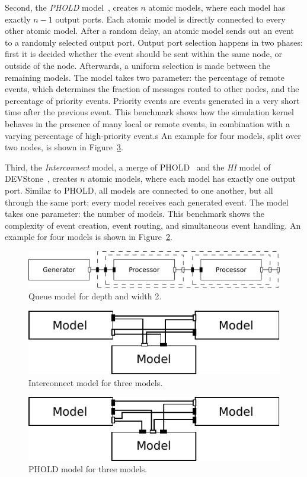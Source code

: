 Second, the \textit{PHOLD} model~\cite{PHOLD}, creates $n$ atomic models, where each model has exactly $n-1$ output ports.
Each atomic model is directly connected to every other atomic model.
After a random delay, an atomic model sends out an event to a randomly selected output port.
Output port selection happens in two phases: first it is decided whether the event should be sent within the same node, or outside of the node.
Afterwards, a uniform selection is made between the remaining models.
The model takes two parameter: the percentage of remote events, which determines the fraction of messages routed to other nodes, and the percentage of priority events. Priority events are events generated in a very short time after the previous event.
This benchmark shows how the simulation kernel behaves in the presence of many local or remote events, in combination with a varying percentage of high-priority event.s
An example for four models, split over two nodes, is shown in Figure~\ref{fig:PHOLD_model}.
	
Third, the \textit{Interconnect} model, a merge of PHOLD~\cite{PHOLD} and the \textit{HI} model of DEVStone~\cite{DEVStone}, creates $n$ atomic models, where each model has exactly one output port.
Similar to PHOLD, all models are connected to one another, but all through the same port: every model receives each generated event.
The model takes one parameter: the number of models.
This benchmark shows the complexity of event creation, event routing, and simultaneous event handling.
An example for four models is shown in Figure~\ref{fig:interconnect_model}.

\begin{figure}
	\center
	\includegraphics[width=\columnwidth]{fig/queue_model_fixed.pdf}
	\caption{Queue model for depth and width 2.}
	\label{fig:queue_model}
\end{figure}
	
\begin{figure}
    \center
	\includegraphics[width=\modelfraction\columnwidth]{fig/interconnect_model.pdf}
	\caption{Interconnect model for three models.}
	\label{fig:interconnect_model}
\end{figure}

\begin{figure}
    \center
	\includegraphics[width=\modelfraction\columnwidth]{fig/phold_model.pdf}
	\caption{PHOLD model for three models.}
	\label{fig:PHOLD_model}
\end{figure}
